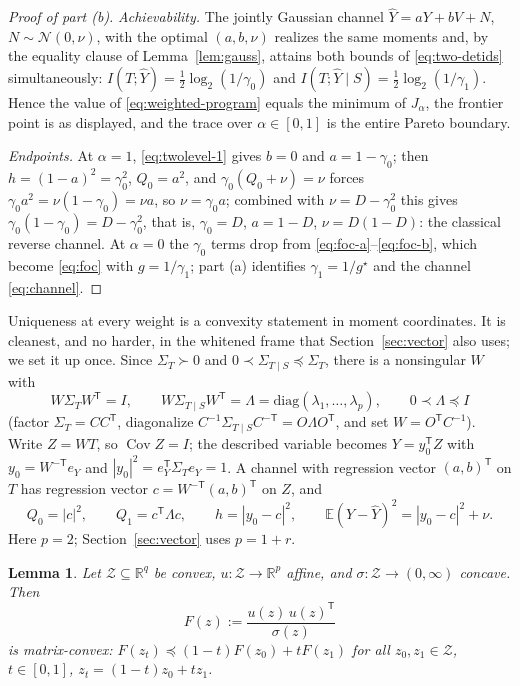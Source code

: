 \documentclass[11pt,onecolumn]{IEEEtran}
\newtheorem{lemma}[theorem]{Lemma}
\newcommand{\E}{\mathbb{E}}
\newcommand{\R}{\mathbb{R}}
\newcommand{\Cov}{\operatorname{Cov}}
\newcommand{\hY}{\widehat{Y}}
\begin{document}
\begin{proof}[Proof of part (b)]
\emph{Achievability.} The jointly Gaussian channel $\hY=aY+bV+N$,
$N\sim\mathcal N(0,\nu)$, with the optimal $(a,b,\nu)$ realizes the same
moments and, by the equality clause of Lemma~\ref{lem:gauss}, attains
both bounds of \eqref{eq:two-detids} simultaneously:
$I(T;\hY)=\tfrac12\log_2(1/\gamma_0)$ and
$I(T;\hY\mid S)=\tfrac12\log_2(1/\gamma_1)$. Hence the value of
\eqref{eq:weighted-program} equals the minimum of $J_\alpha$, the
frontier point is as displayed, and the trace over $\alpha\in[0,1]$ is
the entire Pareto boundary.

\emph{Endpoints.} At $\alpha=1$, \eqref{eq:twolevel-1} gives $b=0$ and
$a=1-\gamma_0$; then $h=(1-a)^2=\gamma_0^2$, $Q_0=a^2$, and
$\gamma_0(Q_0+\nu)=\nu$ forces $\gamma_0a^2=\nu(1-\gamma_0)=\nu a$, so
$\nu=\gamma_0a$; combined with $\nu=D-\gamma_0^2$ this gives
$\gamma_0(1-\gamma_0)=D-\gamma_0^2$, that is, $\gamma_0=D$, $a=1-D$,
$\nu=D(1-D)$: the classical reverse channel. At $\alpha=0$ the
$\gamma_0$ terms drop from \eqref{eq:foc-a}--\eqref{eq:foc-b}, which
become \eqref{eq:foc} with $g=1/\gamma_1$; part (a)
identifies $\gamma_1=1/g^\star$ and the channel \eqref{eq:channel}.
\end{proof}

Uniqueness at every weight is a convexity statement in moment
coordinates. It is cleanest, and no harder, in the whitened frame that
Section~\ref{sec:vector} also uses; we set it up once. Since
$\Sigma_T\succ0$ and $0\prec\Sigma_{T\mid S}\preceq\Sigma_T$, there is
a nonsingular $W$ with
\begin{equation}
W\Sigma_TW^{\mathsf T}=I,
\qquad
W\Sigma_{T\mid S}W^{\mathsf T}
=\Lambda=\mathrm{diag}(\lambda_1,\dots,\lambda_p),
\qquad 0\prec\Lambda\preceq I
\label{eq:whitening}
\end{equation}
(factor $\Sigma_T=CC^{\mathsf T}$, diagonalize
$C^{-1}\Sigma_{T\mid S}C^{-\mathsf T}=O\Lambda O^{\mathsf T}$, and set
$W=O^{\mathsf T}C^{-1}$). Write $Z=WT$, so $\Cov Z=I$; the described
variable becomes
$Y=y_0^{\mathsf T}Z$ with $y_0=W^{-\mathsf T}e_Y$ and
$|y_0|^2=e_Y^{\mathsf T}\Sigma_Te_Y=1$. A channel with regression
vector $(a,b)^{\mathsf T}$ on $T$ has regression vector
$c=W^{-\mathsf T}(a,b)^{\mathsf T}$ on $Z$, and
\[
Q_0=|c|^2,\qquad Q_1=c^{\mathsf T}\Lambda c,\qquad
h=|y_0-c|^2,\qquad
\E(Y-\hY)^2=|y_0-c|^2+\nu .
\]
Here $p=2$; Section~\ref{sec:vector} uses $p=1+r$.

\begin{lemma}\label{lem:mxconvex}
Let $\mathcal Z\subseteq\R^q$ be convex, $u:\mathcal Z\to\R^p$ affine,
and $\sigma:\mathcal Z\to(0,\infty)$ concave. Then
\[
F(z):=\frac{u(z)\,u(z)^{\mathsf T}}{\sigma(z)}
\]
is matrix-convex: $F(z_t)\preceq(1-t)F(z_0)+tF(z_1)$ for all
$z_0,z_1\in\mathcal Z$, $t\in[0,1]$, $z_t=(1-t)z_0+tz_1$.
\end{lemma}
\end{document}
